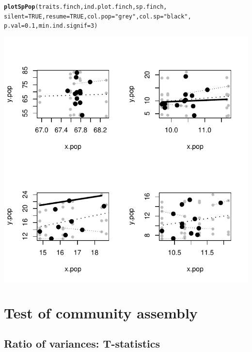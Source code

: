 \documentclass[12pt]{article}\usepackage[]{graphicx}\usepackage[]{color}
\makeatletter
\def\maxwidth{ %
  \ifdim\Gin@nat@width>\linewidth
    \linewidth
  \else
    \Gin@nat@width
  \fi
}
\newcommand{\hlnum}[1]{\textcolor[rgb]{0.686,0.059,0.569}{#1}}%
\newcommand{\hlstr}[1]{\textcolor[rgb]{0.192,0.494,0.8}{#1}}%
\newcommand{\hlstd}[1]{\textcolor[rgb]{0.345,0.345,0.345}{#1}}%
\newcommand{\hlkwc}[1]{\textcolor[rgb]{0.333,0.667,0.333}{#1}}%
\newcommand{\hlkwd}[1]{\textcolor[rgb]{0.737,0.353,0.396}{\textbf{#1}}}%
\newenvironment{kframe}{%
 \def\at@end@of@kframe{}%
 \ifinner\ifhmode%
  \def\at@end@of@kframe{\end{minipage}}%
  \begin{minipage}{\columnwidth}%
 \fi\fi%
 \def\FrameCommand##1{\hskip\@totalleftmargin \hskip-\fboxsep
 \colorbox{shadecolor}{##1}\hskip-\fboxsep
     \hskip-\linewidth \hskip-\@totalleftmargin \hskip\columnwidth}%
 \MakeFramed {\advance\hsize-\width
   \@totalleftmargin\z@ \linewidth\hsize
   \@setminipage}}%
 {\par\unskip\endMakeFramed%
 \at@end@of@kframe}
\newenvironment{knitrout}{}{} %
\makeatother
\begin{document}
\begin{knitrout}
\color{fgcolor}\begin{kframe}
\begin{alltt}
\hlkwd{plotSpPop}\hlstd{(traits.finch, ind.plot.finch, sp.finch,}
      \hlkwc{silent} \hlstd{=} \hlnum{TRUE}\hlstd{,} \hlkwc{resume} \hlstd{=} \hlnum{TRUE}\hlstd{,} \hlkwc{col.pop} \hlstd{=} \hlstr{"grey"}\hlstd{,} \hlkwc{col.sp} \hlstd{=} \hlstr{"black"}\hlstd{,}
      \hlkwc{p.val} \hlstd{=} \hlnum{0.1}\hlstd{,} \hlkwc{min.ind.signif} \hlstd{=} \hlnum{3}\hlstd{)}
\end{alltt}
\end{kframe}

{\centering \includegraphics[width=\maxwidth]{figure/unnamed-chunk-31} 

}



\end{knitrout}


\newpage

\section{Test of community assembly}

\subsection{Ratio of variances: T-statistics}
\end{document}
